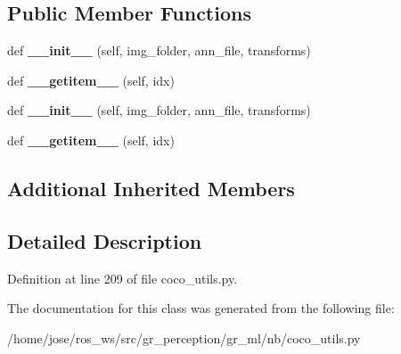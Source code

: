\subsection*{Public Member Functions}
\begin{DoxyCompactItemize}
\item 
\mbox{\label{classcoco__utils_1_1CocoDetection_a7cf66e3b9298463b16da16f6cbfcc037}} 
def {\bfseries \+\_\+\+\_\+init\+\_\+\+\_\+} (self, img\+\_\+folder, ann\+\_\+file, transforms)
\item 
\mbox{\label{classcoco__utils_1_1CocoDetection_aadb678f4afe1572a961f6b40e40d4aea}} 
def {\bfseries \+\_\+\+\_\+getitem\+\_\+\+\_\+} (self, idx)
\item 
\mbox{\label{classcoco__utils_1_1CocoDetection_a7cf66e3b9298463b16da16f6cbfcc037}} 
def {\bfseries \+\_\+\+\_\+init\+\_\+\+\_\+} (self, img\+\_\+folder, ann\+\_\+file, transforms)
\item 
\mbox{\label{classcoco__utils_1_1CocoDetection_aadb678f4afe1572a961f6b40e40d4aea}} 
def {\bfseries \+\_\+\+\_\+getitem\+\_\+\+\_\+} (self, idx)
\end{DoxyCompactItemize}
\subsection*{Additional Inherited Members}


\subsection{Detailed Description}


Definition at line 209 of file coco\+\_\+utils.\+py.



The documentation for this class was generated from the following file\+:\begin{DoxyCompactItemize}
\item 
/home/jose/ros\+\_\+ws/src/gr\+\_\+perception/gr\+\_\+ml/nb/coco\+\_\+utils.\+py\end{DoxyCompactItemize}
